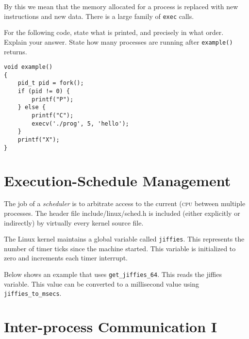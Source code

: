 By this we mean that the memory allocated for a process is replaced with new 
instructions and new data. There is a large family of \lstinline{exec} calls.

\frmrule

\begin{example}
For the following code, state what is printed, and precisely in what order.
Explain your answer. State how many processes are running 
after \lstinline{example()} returns.

\begin{lstlisting}
void example()
{
	pid_t pid = fork();
	if (pid != 0) {
		printf("P");
	} else {
		printf("C");
		execv('./prog', 5, 'hello');
	}       
	printf("X");
}
\end{lstlisting}
\end{example}



\section{Execution-Schedule Management}

The job of a \textit{scheduler} is to arbitrate access to the 
current (\textsc{cpu} between multiple processes.
The header file include/linux/sched.h is included (either explicitly or indirectly) by
virtually every kernel source file.

The Linux kernel maintains a global variable called \lstinline{jiffies}. 
This represents the number of timer ticks since the machine started. 
This variable is initialized to zero and increments each timer interrupt.

Below shows an example that uses \lstinline{get_jiffies_64}. This reads the jiffies 
variable. This value can be converted to a millisecond value using 
\lstinline{jiffies_to_msecs}.







\section{Inter-process Communication I}



